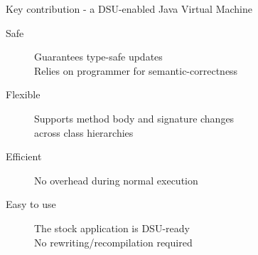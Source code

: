 \begin{frame}{Key contribution}%
\DSU{} - a DSU-enabled Java Virtual Machine \\
\begin{description}
\item[Safe] Guarantees type-safe updates\\
              Relies on programmer for semantic-correctness
\item[Flexible] Supports method body and signature changes\\
                   across class hierarchies
\item[Efficient] No overhead during normal execution
\item[Easy to use] The stock application is DSU-ready\\
                   No rewriting/recompilation required
\end{description}
\end{frame}

% 
